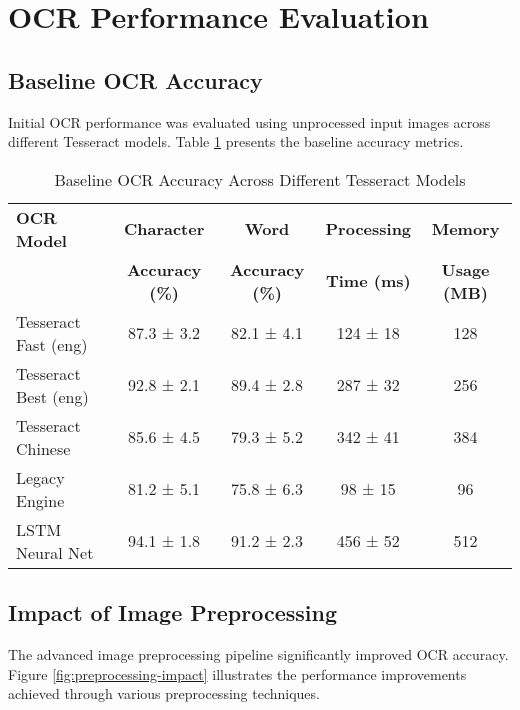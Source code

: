 \section{OCR Performance Evaluation}
\label{sec:ocr-performance}

\subsection{Baseline OCR Accuracy}

Initial OCR performance was evaluated using unprocessed input images across different Tesseract models. Table \ref{tab:baseline-ocr} presents the baseline accuracy metrics.

\begin{table}[h!]
\centering
\caption{Baseline OCR Accuracy Across Different Tesseract Models}
\label{tab:baseline-ocr}
\begin{tabular}{|l|c|c|c|c|}
\hline
\textbf{OCR Model} & \textbf{Character} & \textbf{Word} & \textbf{Processing} & \textbf{Memory} \\
                   & \textbf{Accuracy (\%)} & \textbf{Accuracy (\%)} & \textbf{Time (ms)} & \textbf{Usage (MB)} \\
\hline
Tesseract Fast (eng) & 87.3 ± 3.2 & 82.1 ± 4.1 & 124 ± 18 & 128 \\
Tesseract Best (eng) & 92.8 ± 2.1 & 89.4 ± 2.8 & 287 ± 32 & 256 \\
Tesseract Chinese & 85.6 ± 4.5 & 79.3 ± 5.2 & 342 ± 41 & 384 \\
Legacy Engine & 81.2 ± 5.1 & 75.8 ± 6.3 & 98 ± 15 & 96 \\
LSTM Neural Net & 94.1 ± 1.8 & 91.2 ± 2.3 & 456 ± 52 & 512 \\
\hline
\end{tabular}
\end{table}

\subsection{Impact of Image Preprocessing}

The advanced image preprocessing pipeline significantly improved OCR accuracy. Figure \ref{fig:preprocessing-impact} illustrates the performance improvements achieved through various preprocessing techniques.

